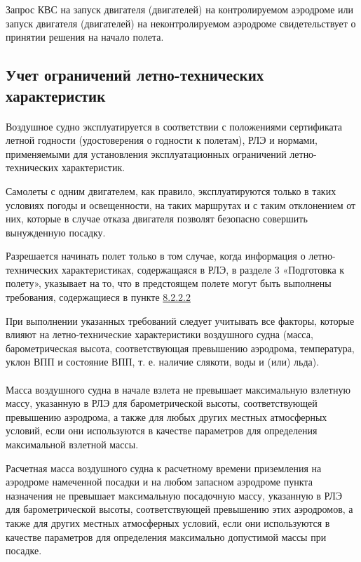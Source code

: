 Запрос КВС на запуск двигателя (двигателей) на контролируемом аэродроме или запуск двигателя (двигателей) на неконтролируемом аэродроме свидетельствует о принятии решения на начало полета.


\subsection{Учет ограничений летно-технических характеристик}


\paragraph{} Воздушное судно эксплуатируется в соответствии с положениями сертификата летной годности (удостоверения о годности к полетам), РЛЭ и нормами, применяемыми для установления эксплуатационных ограничений летно-технических характеристик.	

Самолеты с одним двигателем, как правило, эксплуатируются только в таких условиях погоды и освещенности, на таких маршрутах и с таким отклонением от них, которые в случае отказа двигателя позволят безопасно совершить вынужденную посадку. 

Разрешается начинать полет только в том случае, когда информация о летно-технических характеристиках, содержащаяся в РЛЭ, в разделе 3 «Подготовка к полету», указывает на то, что в предстоящем полете могут быть выполнены требования, содержащиеся в пункте \hyperref[sec:8222]{8.2.2.2}

При выполнении указанных требований следует учитывать все факторы, которые влияют на летно-технические характеристики воздушного судна (масса, барометрическая высота, соответствующая превышению аэродрома, температура, уклон ВПП и состояние ВПП, т. е. наличие слякоти, воды и (или) льда). 

\paragraph{} \label{sec:8222}Масса воздушного судна в начале взлета не превышает максимальную взлетную массу, указанную в РЛЭ для барометрической высоты, соответствующей превышению аэродрома, а также для любых других местных атмосферных условий, если они используются в качестве параметров для определения максимальной взлетной массы. 

Расчетная масса воздушного судна к расчетному времени приземления на аэродроме намеченной посадки и на любом запасном аэродроме пункта назначения не превышает максимальную посадочную массу, указанную в РЛЭ для барометрической высоты, соответствующей превышению этих аэродромов, а также для других местных атмосферных условий, если они используются в качестве параметров для определения максимально допустимой массы при посадке. 

